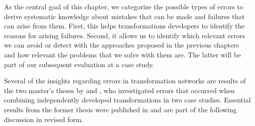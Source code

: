
As the central goal of this chapter, we categorize the possible types of errors to derive systematic knowledge about mistakes that can be made and failures that can arise from them.
First, this helps transformations developers to identify the reasons for arising failures.
Second, it allows us to identify which relevant errors we can avoid or detect with the approaches proposed in the previous chapters and how relevant the problems that we solve with them are.
The latter will be part of our subsequent evaluation at a case study.

Several of the insights regarding errors in transformation networks are results of the two master's theses by \textcite{syma2018ma} and \textcite{saglam2020ma}, who investigated errors that occurred when combining independently developed transformations in two case studies.
Essential results from the former thesis were published in  and are part of the following discussion in revised form.





